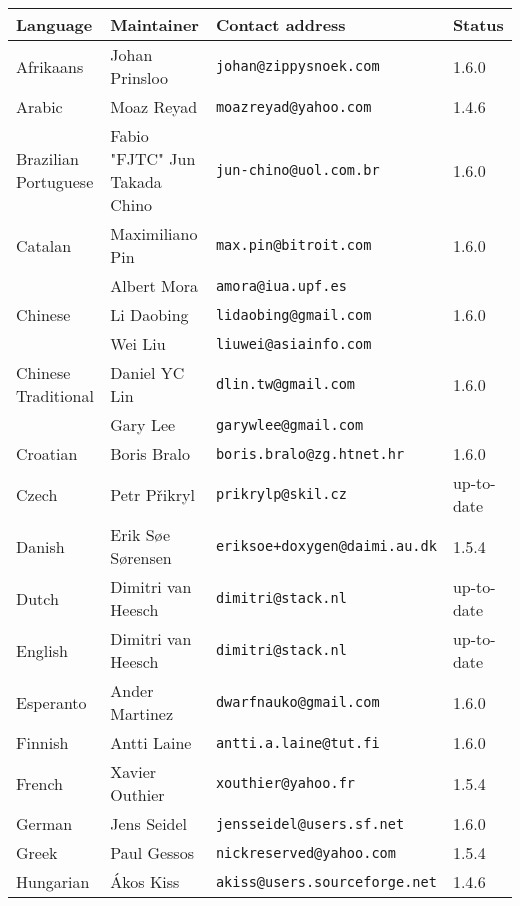  
\begin{tabular}{|l|l|l|l|}
  \hline 
  {\bf Language} & {\bf Maintainer} & {\bf Contact address} & {\bf Status} \\
  \hline

  \hline
  Afrikaans & Johan Prinsloo & {\tt\tiny johan@zippysnoek.com} & 1.6.0 \\
  \hline
  Arabic & Moaz Reyad & {\tt\tiny moazreyad@yahoo.com} & 1.4.6 \\
  \hline
  Brazilian Portuguese & Fabio "FJTC" Jun Takada Chino & {\tt\tiny jun-chino@uol.com.br} & 1.6.0 \\
  \hline
  Catalan & Maximiliano Pin & {\tt\tiny max.pin@bitroit.com} & 1.6.0 \\
  ~ & Albert Mora & {\tt\tiny amora@iua.upf.es} & ~ \\
  \hline
  Chinese & Li Daobing & {\tt\tiny lidaobing@gmail.com} & 1.6.0 \\
  ~ & Wei Liu & {\tt\tiny liuwei@asiainfo.com} & ~ \\
  \hline
  Chinese Traditional & Daniel YC Lin & {\tt\tiny dlin.tw@gmail.com} & 1.6.0 \\
  ~ & Gary Lee & {\tt\tiny garywlee@gmail.com} & ~ \\
  \hline
  Croatian & Boris Bralo & {\tt\tiny boris.bralo@zg.htnet.hr} & 1.6.0 \\
  \hline
  Czech & Petr P\v{r}ikryl & {\tt\tiny prikrylp@skil.cz} & up-to-date \\
  \hline
  Danish & Erik S\o{}e S\o{}rensen & {\tt\tiny eriksoe+doxygen@daimi.au.dk} & 1.5.4 \\
  \hline
  Dutch & Dimitri van Heesch & {\tt\tiny dimitri@stack.nl} & up-to-date \\
  \hline
  English & Dimitri van Heesch & {\tt\tiny dimitri@stack.nl} & up-to-date \\
  \hline
  Esperanto & Ander Martinez & {\tt\tiny dwarfnauko@gmail.com} & 1.6.0 \\
  \hline
  Finnish & Antti Laine & {\tt\tiny antti.a.laine@tut.fi} & 1.6.0 \\
  \hline
  French & Xavier Outhier & {\tt\tiny xouthier@yahoo.fr} & 1.5.4 \\
  \hline
  German & Jens Seidel & {\tt\tiny jensseidel@users.sf.net} & 1.6.0 \\
  \hline
  Greek & Paul Gessos & {\tt\tiny nickreserved@yahoo.com} & 1.5.4 \\
  \hline
  Hungarian & \'{A}kos Kiss & {\tt\tiny akiss@users.sourceforge.net} & 1.4.6 \\

\end{tabular}
